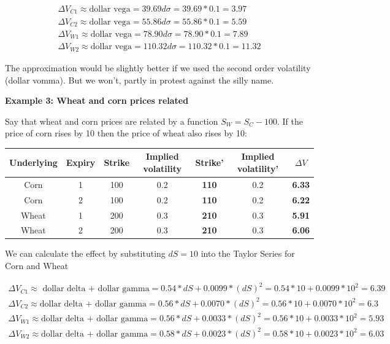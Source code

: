 \begin{eqnarray*}
\Delta V_{C1} \approx \mbox{dollar vega}  = 39.69 d\sigma  = 39.69 *0.1 = 3.97\\
\Delta V_{C2} \approx \mbox{dollar vega}  = 55.86 d\sigma  = 55.86 *0.1 = 5.59\\
\Delta V_{W1} \approx \mbox{dollar vega} = 78.90 d\sigma = 78.90*0.1 = 7.89\\
\Delta V_{W2} \approx \mbox{dollar vega} = 110.32 d\sigma = 110.32*0.1 = 11.32
\end{eqnarray*}

The approximation would be slightly better if we used the second order volatility (dollar vomma). But we won't, partly in protest against the silly name. 

\textbf{Example 3: Wheat and corn prices related}

Say that wheat and corn prices are related by a function $S_W = S_C-100$. If the price of corn rises by 10 then the price of wheat also rises by 10:

\begin{tabular}{|c|c|c|c|c|c|c|}
\hline
Underlying & Expiry & Strike & Implied volatility & Strike' & Implied volatility' & $\Delta V$\\ 
\hline
Corn & 1 & 100 & 0.2 & \textbf{110} & 0.2 & \textbf{6.33} \\
Corn & 2 & 100 & 0.2& \textbf{110} & 0.2 & \textbf{6.22} \\
Wheat & 1 & 200 & 0.3& \textbf{210} & 0.3 & \textbf{5.91} \\
Wheat & 2 & 200 & 0.3& \textbf{210} & 0.3 & \textbf{6.06}  \\
\hline
\end{tabular}

We can calculate the effect by substituting $dS = 10$ into the Taylor Series for Corn and Wheat

\begin{eqnarray*}
\Delta V_{C1} \approx \mbox{ dollar delta + dollar gamma} = 0.54*dS + 0.0099*(dS)^2 = 0.54*10+0.0099*10^2 = 6.39\\
\Delta V_{C2} \approx \mbox{dollar delta + dollar gamma} = 0.56*dS + 0.0070*(dS)^2= 0.56*10+0.0070*10^2 = 6.3\\
\Delta V_{W1} \approx \mbox{dollar delta + dollar gamma} = 0.56*dS + 0.0033*(dS)^2 = 0.56*10+0.0033*10^2 = 5.93\\
\Delta V_{W2} \approx \mbox{dollar delta + dollar gamma} = 0.58*dS + 0.0023*(dS)^2= 0.58*10+0.0023*10^2 = 6.03\\
\end{eqnarray*}


